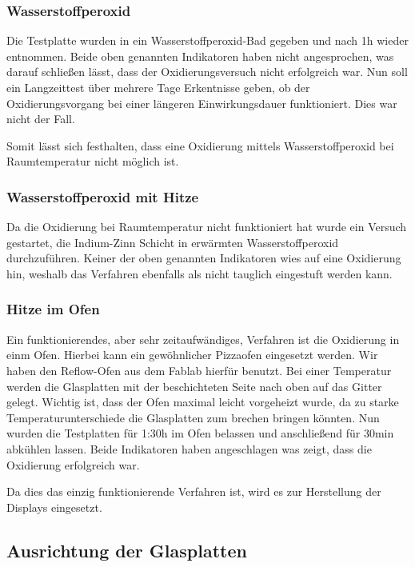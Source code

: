 \subsubsection{Wasserstoffperoxid}

Die Testplatte wurden in ein Wasserstoffperoxid-Bad gegeben und nach 1h wieder entnommen. Beide oben genannten Indikatoren haben nicht angesprochen, was darauf schließen lässt, dass der Oxidierungsversuch nicht erfolgreich war.
Nun soll ein Langzeittest über mehrere Tage Erkentnisse geben, ob der Oxidierungsvorgang bei einer längeren Einwirkungsdauer funktioniert. Dies war nicht der Fall.

Somit lässt sich festhalten, dass eine Oxidierung mittels Wasserstoffperoxid bei Raumtemperatur nicht möglich ist.

\subsubsection{Wasserstoffperoxid mit Hitze}

Da die Oxidierung bei Raumtemperatur nicht funktioniert hat wurde ein Versuch gestartet, die Indium-Zinn Schicht in erwärmten Wasserstoffperoxid durchzuführen.
Keiner der oben genannten Indikatoren wies auf eine Oxidierung hin, weshalb das Verfahren ebenfalls als nicht tauglich eingestuft werden kann.

\subsubsection{Hitze im Ofen}

Ein funktionierendes, aber sehr zeitaufwändiges, Verfahren ist die Oxidierung in einm Ofen. Hierbei kann ein gewöhnlicher Pizzaofen eingesetzt werden. Wir haben den Reflow-Ofen aus dem Fablab hierfür benutzt.
Bei einer Temperatur werden die Glasplatten mit der beschichteten Seite nach oben auf das Gitter gelegt. Wichtig ist, dass der Ofen maximal leicht vorgeheizt wurde, da zu starke Temperaturunterschiede die Glasplatten zum brechen bringen könnten. Nun wurden die Testplatten für 1:30h im Ofen belassen und anschließend für 30min abkühlen lassen.
Beide Indikatoren haben angeschlagen was zeigt, dass die Oxidierung erfolgreich war.

Da dies das einzig funktionierende Verfahren ist, wird es zur Herstellung der Displays eingesetzt.

\subsection{Ausrichtung der Glasplatten}
